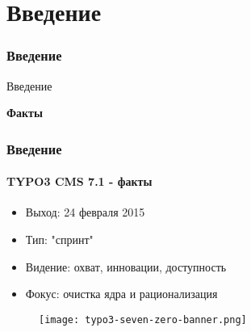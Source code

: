 %

\section{Введение}
\begin{frame}[fragile]
	\frametitle{Введение}

	\begin{center}\huge{Введение}\end{center}
	\begin{center}\huge{\color{typo3darkgrey}\textbf{Факты}}\end{center}

\end{frame}


\begin{frame}[fragile]
	\frametitle{Введение}
	\framesubtitle{TYPO3 CMS 7.1 - факты}

	\begin{itemize}
		\item Выход: 24 февраля 2015
		\item Тип: "спринт"
		\item Видение: охват, инновации, доступность
		\item Фокус: очистка ядра и рационализация
	\end{itemize}

	\begin{figure}
		\texttt{[image: typo3-seven-zero-banner.png]}
	\end{figure}

\end{frame}

